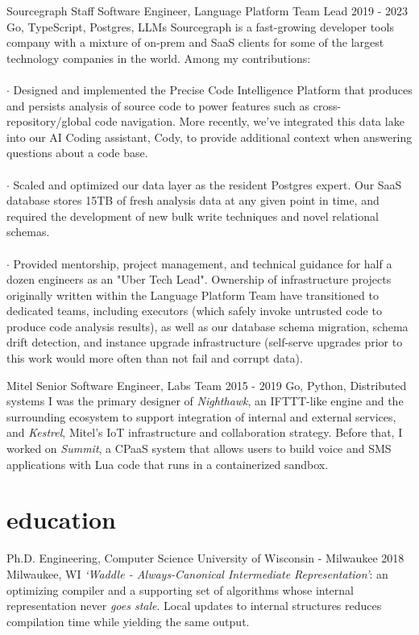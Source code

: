 \documentclass[]{clean-resume}
\begin{document}
\detailentry
  {Sourcegraph}
  {Staff Software Engineer, Language Platform Team Lead}
  {2019 - 2023}
  {Go, TypeScript, Postgres, LLMs}
  {
    Sourcegraph is a fast-growing developer tools company with a mixture of on-prem and SaaS clients for some of the largest technology companies in the world. Among my contributions:
    \\\\
    $\cdot$ Designed and implemented the Precise Code Intelligence Platform that produces and persists analysis of source code to power features such as cross-repository/global code navigation. More recently, we've integrated this data lake into our AI Coding assistant, Cody, to provide additional context when answering questions about a code base. \\\\
    $\cdot$ Scaled and optimized our data layer as the resident Postgres expert. Our SaaS database stores 15TB of fresh analysis data at any given point in time, and required the development of new bulk write techniques and novel relational schemas. \\\\
    $\cdot$ Provided mentorship, project management, and technical guidance for half a dozen engineers as an "Uber Tech Lead". Ownership of infrastructure projects originally written within the Language Platform Team have transitioned to dedicated teams, including executors (which safely invoke untrusted code to produce code analysis results), as well as our database schema migration, schema drift detection, and instance upgrade infrastructure (self-serve upgrades prior to this work would more often than not fail and corrupt data).
  }

\detailentry
  {Mitel}
  {Senior Software Engineer, Labs Team}
  {2015 - 2019}
  {Go, Python, Distributed systems}
  {
    I was the primary designer of \emph{Nighthawk}, an IFTTT-like engine and the surrounding ecosystem to support integration of internal and external services, and \emph{Kestrel}, Mitel's IoT infrastructure and collaboration strategy. Before that, I worked on \emph{Summit}, a CPaaS system that allows users to build voice and SMS applications with Lua code that runs in a containerized sandbox.
  }

\section{education}

\detailentry
  {Ph.D. Engineering, Computer Science}
  {University of Wisconsin - Milwaukee}
  {2018}
  {Milwaukee, WI}
  {
    \emph{`Waddle - Always-Canonical Intermediate Representation'}: an optimizing compiler and a supporting set of algorithms whose internal representation never \emph{goes stale}. Local updates to internal structures reduces compilation time while yielding the same output.
  }
\end{document}
